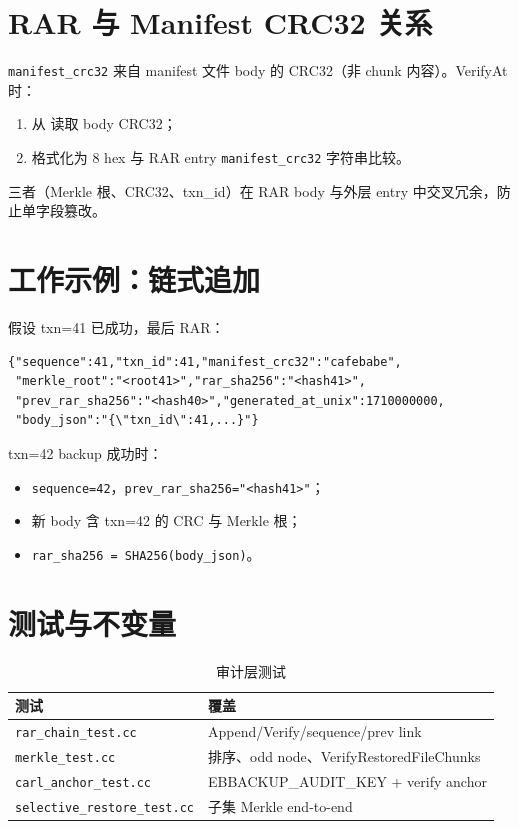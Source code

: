 \section{RAR 与 Manifest CRC32 关系}

\texttt{manifest\_crc32} 来自 manifest 文件 body 的 CRC32（非 chunk 内容）。VerifyAt 时：
\begin{enumerate}
  \item 从  读取 body CRC32；
  \item 格式化为 8 hex 与 RAR entry \texttt{manifest\_crc32} 字符串比较。
\end{enumerate}

三者（Merkle 根、CRC32、txn\_id）在 RAR body 与外层 entry 中交叉冗余，防止单字段篡改。

\section{工作示例：链式追加}

假设 txn=41 已成功，最后 RAR：
\begin{lstlisting}[caption={RAR chain 行示例（简化）},label={lst:rar-line}]
{"sequence":41,"txn_id":41,"manifest_crc32":"cafebabe",
 "merkle_root":"<root41>","rar_sha256":"<hash41>",
 "prev_rar_sha256":"<hash40>","generated_at_unix":1710000000,
 "body_json":"{\"txn_id\":41,...}"}
\end{lstlisting}

txn=42 backup 成功时：
\begin{itemize}[nosep]
  \item \texttt{sequence=42}，\texttt{prev\_rar\_sha256="<hash41>"}；
  \item 新 body 含 txn=42 的 CRC 与 Merkle 根；
  \item \texttt{rar\_sha256 = SHA256(body\_json)}。
\end{itemize}

\section{测试与不变量}

\begin{table}[htbp]
\centering
\caption{审计层测试}
\small
\begin{tabular}{@{}ll@{}}
\toprule
测试 & 覆盖 \\
\midrule
\texttt{rar\_chain\_test.cc} & Append/Verify/sequence/prev link \\
\texttt{merkle\_test.cc} & 排序、odd node、VerifyRestoredFileChunks \\
\texttt{carl\_anchor\_test.cc} & EBBACKUP\_AUDIT\_KEY + verify anchor \\
\texttt{selective\_restore\_test.cc} & 子集 Merkle end-to-end \\
\bottomrule
\end{tabular}
\end{table}

